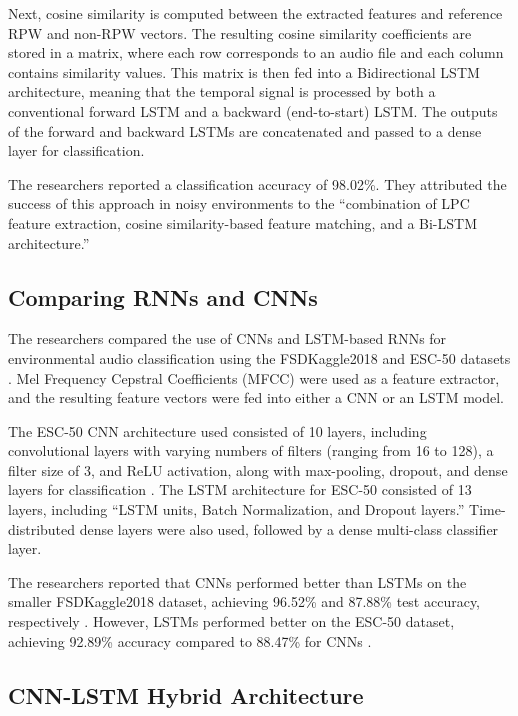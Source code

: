 \documentclass[12pt,a4paper,oneside]{memoir}
\begin{document}
Next, cosine similarity is computed between the extracted features and reference RPW and non-RPW vectors. The resulting cosine similarity coefficients are stored in a matrix, where each row corresponds to an audio file and each column contains similarity values. This matrix is then fed into a Bidirectional LSTM architecture, meaning that the temporal signal is processed by both a conventional forward LSTM and a backward (end-to-start) LSTM. The outputs of the forward and backward LSTMs are concatenated and passed to a dense layer for classification.

The researchers reported a classification accuracy of 98.02\%. They attributed the success of this approach in noisy environments to the ``combination of LPC feature extraction, cosine similarity-based feature matching, and a Bi-LSTM architecture.''

\subsection{Comparing RNNs and CNNs}

The researchers compared the use of CNNs and LSTM-based RNNs for environmental audio classification using the FSDKaggle2018 and ESC-50 datasets \cite{rezaul2024,fonseca2018}. Mel Frequency Cepstral Coefficients (MFCC) were used as a feature extractor, and the resulting feature vectors were fed into either a CNN or an LSTM model.

The ESC-50 CNN architecture used consisted of 10 layers, including convolutional layers with varying numbers of filters (ranging from 16 to 128), a filter size of 3, and ReLU activation, along with max-pooling, dropout, and dense layers for classification \cite{rezaul2024}. The LSTM architecture for ESC-50 consisted of 13 layers, including ``LSTM units, Batch Normalization, and Dropout layers.'' Time-distributed dense layers were also used, followed by a dense multi-class classifier layer.

The researchers reported that CNNs performed better than LSTMs on the smaller FSDKaggle2018 dataset, achieving 96.52\% and 87.88\% test accuracy, respectively \cite{rezaul2024,fonseca2018}. However, LSTMs performed better on the ESC-50 dataset, achieving 92.89\% accuracy compared to 88.47\% for CNNs \cite{rezaul2024}.

\subsection{CNN-LSTM Hybrid Architecture}
\end{document}
